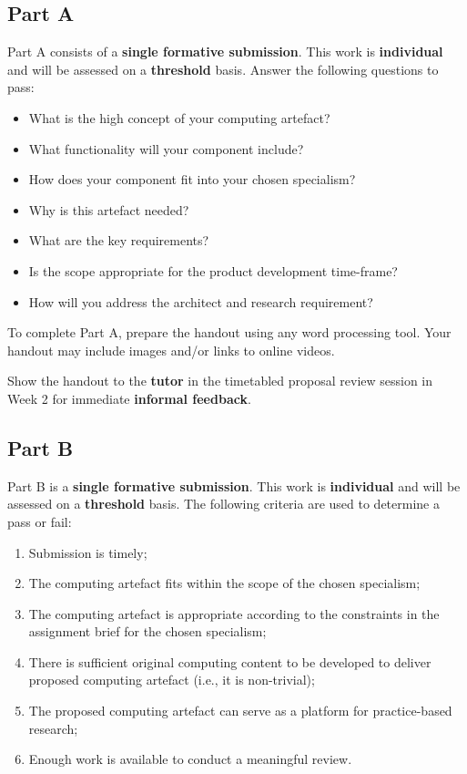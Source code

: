 \documentclass{../../fal_assignment}
\begin{document}
\subsection*{Part A}

Part A consists of a \textbf{single formative submission}. This work is \textbf{individual} and will be assessed on a \textbf{threshold} basis. Answer the following questions to pass:

\begin{itemize}
	\item What is the high concept of your computing artefact?
	\item What functionality will your component include?
	\item How does your component fit into your chosen specialism?
	\item Why is this artefact needed?
	\item What are the key requirements?
	\item Is the scope appropriate for the product development time-frame?
	\item How will you address the architect and research requirement?
\end{itemize}

To complete Part A, prepare the handout using any word processing tool.
Your handout may include images and/or links to online videos.

Show the handout to the \textbf{tutor} in the timetabled proposal review session in Week 2 for immediate \textbf{informal feedback}.

\subsection*{Part B}

Part B is a \textbf{single formative submission}. This work is \textbf{individual} and will be assessed on a \textbf{threshold} basis. The following criteria are used to determine a pass or fail:

\begin{enumerate}[label=(\alph*)]
	\item Submission is timely;
	\item The computing artefact fits within the scope of the chosen specialism;
	\item The computing artefact is appropriate according to the constraints in the assignment brief for the chosen specialism;
	\item There is sufficient original computing content to be developed to deliver proposed computing artefact (i.e., it is non-trivial);
	\item The proposed computing artefact can serve as a platform for practice-based research;
	\item Enough work is available to conduct a meaningful review.
\end{enumerate}
\end{document}
